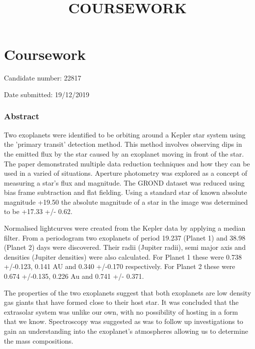 \documentclass[11pt]{article}
\title{COURSEWORK}
\begin{document}
    
    
    \maketitle
    
    

    
    \section{Coursework}\label{coursework}

    Candidate number: 22817

Date submitted: 19/12/2019

    \subsubsection{Abstract}\label{abstract}

    Two exoplanets were identified to be orbiting around a Kepler star
system using the 'primary transit' detection method. This method
involves observing dips in the emitted flux by the star caused by an
exoplanet moving in front of the star. The paper demonstrated multiple
data reduction techniques and how they can be used in a varied of
situations. Aperture photometry was explored as a concept of measuring a
star's flux and magnitude. The GROND dataset was reduced using bias
frame subtraction and flat fielding. Using a standard star of known
absolute magnitude +19.50 the absolute magnitude of a star in the image
was determined to be +17.33 +/- 0.62.

Normalised lightcurves were created from the Kepler data by applying a
median filter. From a periodogram two exoplanets of period 19.237
(Planet 1) and 38.98 (Planet 2) days were discovered. Their radii
(Jupiter radii), semi major axis and densities (Jupiter densities) were
also calculated. For Planet 1 these were 0.738 +/-0.123, 0.141 AU and
0.340 +/-0.170 respectively. For Planet 2 these were 0.674 +/-0.135,
0.226 Au and 0.741 +/- 0.371.

The properties of the two exoplanets suggest that both exoplanets are
low density gas giants that have formed close to their host star. It was
concluded that the extrasolar system was unlike our own, with no
possibility of hosting in a form that we know. Spectroscopy was
suggested as was to follow up investigations to gain an understanding
into the exoplanet's atmospheres allowing us to determine the mass
compositions.
\end{document}
